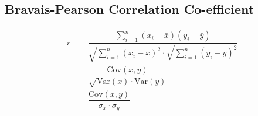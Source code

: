 \documentclass[openany,b5paper]{article}
\begin{document}
\subsection{Bravais-Pearson Correlation Co-efficient}
\begin{align}
r &= \dfrac{\sum_{i=1}^n (x_i-\bar{x})(y_i-\bar{y})}{\sqrt{\sum_{i=1}^n (x_i-\bar{x})^2} \cdot \sqrt{\sum_{i=1}^n (y_i -\bar{y})^2}}\\
& = \dfrac{\text{Cov}(x,y)}{\sqrt{\text{Var}(x) \cdot \text{Var}(y)}}\\
& = \dfrac{\text{Cov}(x,y)}{\sigma_x \cdot \sigma_y}
\end{align}
\end{document}
